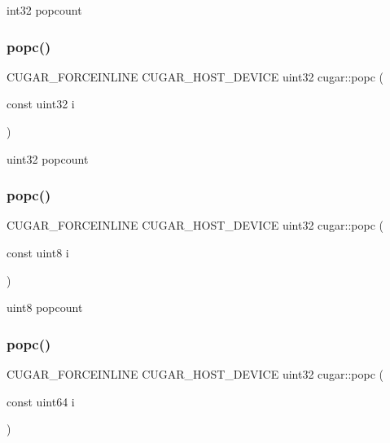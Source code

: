 int32 popcount \mbox{\label{group___bits_module_gac8ac259ac805ab9499212e88829c6723}} 
\subsubsection{\texorpdfstring{popc()}{popc()}\hspace{0.1cm}{\footnotesize\ttfamily [2/4]}}
{\footnotesize\ttfamily C\+U\+G\+A\+R\+\_\+\+F\+O\+R\+C\+E\+I\+N\+L\+I\+NE C\+U\+G\+A\+R\+\_\+\+H\+O\+S\+T\+\_\+\+D\+E\+V\+I\+CE uint32 cugar\+::popc (\begin{DoxyParamCaption}\item[{const uint32}]{i }\end{DoxyParamCaption})}

uint32 popcount \mbox{\label{group___bits_module_ga073933cb13ac2d78195d52f59b3460a7}} 
\subsubsection{\texorpdfstring{popc()}{popc()}\hspace{0.1cm}{\footnotesize\ttfamily [3/4]}}
{\footnotesize\ttfamily C\+U\+G\+A\+R\+\_\+\+F\+O\+R\+C\+E\+I\+N\+L\+I\+NE C\+U\+G\+A\+R\+\_\+\+H\+O\+S\+T\+\_\+\+D\+E\+V\+I\+CE uint32 cugar\+::popc (\begin{DoxyParamCaption}\item[{const uint8}]{i }\end{DoxyParamCaption})}

uint8 popcount \mbox{\label{group___bits_module_ga64c0867f55f331496bc7617303b9e650}} 
\subsubsection{\texorpdfstring{popc()}{popc()}\hspace{0.1cm}{\footnotesize\ttfamily [4/4]}}
{\footnotesize\ttfamily C\+U\+G\+A\+R\+\_\+\+F\+O\+R\+C\+E\+I\+N\+L\+I\+NE C\+U\+G\+A\+R\+\_\+\+H\+O\+S\+T\+\_\+\+D\+E\+V\+I\+CE uint32 cugar\+::popc (\begin{DoxyParamCaption}\item[{const uint64}]{i }\end{DoxyParamCaption})}

